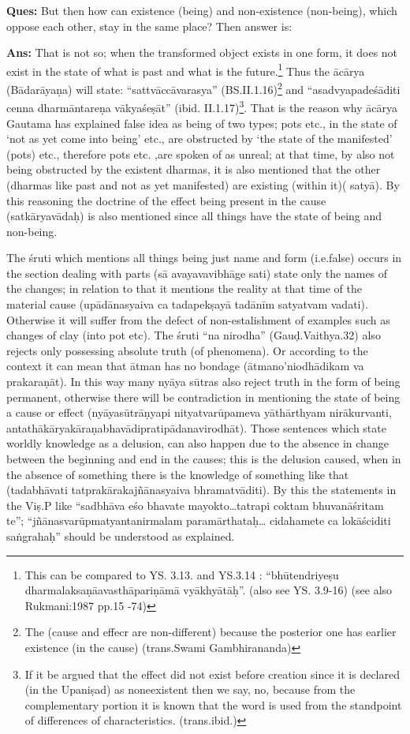\textbf{Ques:} But then how can existence (being) and non-existence (non-being), which oppose each other, stay in the same place? Then answer is: 

\textbf{Ans:} That is not so; when the transformed object exists in one form, it does not exist in the state of what is past and what is the future.\footnote{This can be compared to YS. 3.13. and YS.3.14 : “bhūtendriyeṣu dharmalaksaṇāavasthāpariṇāmā vyākhyātāḥ”. (also see YS. 3.9-16) (see also Rukmani:1987 pp.15 -74)} Thus the ācārya (Bādarāyaṇa) will state: “sattvāccāvarasya” (BS.II.1.16)\footnote{The (cause and effecr are non-different) because the posterior one has earlier existence (in the cause) (trans.Swami Gambhirananda)} and “asadvyapadeśāditi cenna dharmāntareṇa vākyaśeṣāt” (ibid. II.1.17)\footnote{If it be argued that the effect did not exist before creation since it is declared (in the Upaniṣad) as noneexistent then we say, no, because from the complementary portion it is known that the word is used from the standpoint of differences of characteristics. (trans.ibid.)}. That is the reason why ācārya Gautama has explained false idea as being of two types; pots etc., in the state of ‘not as yet come into being’ etc., are obstructed by ‘the state of  the manifested’ (pots) etc., therefore pots etc. ,are spoken of as unreal; at that time, by also not being obstructed by the existent dharmas, it is also mentioned  that the other (dharmas like past and not as yet manifested) are existing (within it)( satyā). By this reasoning the doctrine of the effect being present in the cause (satkāryavādaḥ) is also mentioned since all things have the state of being and non-being. 

The śruti which mentions all things being just name and form (i.e.false) occurs in the section dealing with parts (sā avayavavibhāge sati) state only the names of the changes; in relation to that it mentions the reality at that time of the material cause (upādānasyaiva ca tadapekṣayā tadānīm satyatvam vadati). Otherwise it will suffer from the defect of non-estalishment of examples such as changes of clay (into pot etc). The śruti “na nirodha” (Gauḍ.Vaithya.32) also rejects only possessing absolute truth (of phenomena). Or according to the context it can mean that ātman has no bondage (ātmano’niodhādikam va prakaraṇāt). In this way many nyāya sūtras also reject truth in the form of being permanent, otherwise there will be contradiction in mentioning the state of being a cause or effect (nyāyasūtrāṇyapi nityatvarūpameva yāthārthyam nirākurvanti, antathākāryakāraṇabhavādipratipādanavirodhāt). Those sentences which state worldly knowledge as a delusion, can also happen due to the absence in change between the beginning and end in the causes; this is the delusion caused, when in the absence of something there is the knowledge of something like that (tadabhāvati tatprakārakajñānasyaiva bhramatvāditi). By this the statements in the Viṣ.P like “sadbhāva eśo bhavate mayokto…tatrapi coktam bhuvanāśritam te”;  “jñānasvarūpmatyantanirmalam paramārthataḥ…\- cidahamete ca lokāściditi saṅgrahaḥ” should be understood as explained.

